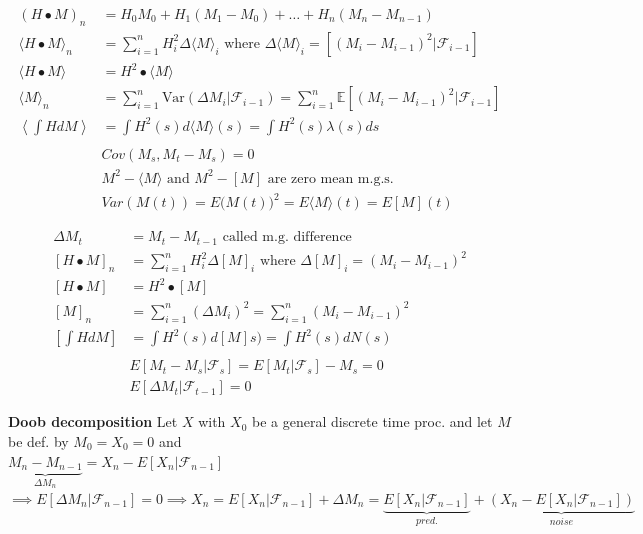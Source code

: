 \documentclass{article}
\begin{document}
\begin{minipage}{0.5\textwidth}
	\begin{align*}
		(H\bullet M)_n &= H_0M_0 + H_1(M_1-M_0) + \hdots + H_n(M_n-M_{n-1}) \\
		\langle H\bullet M \rangle_n &= \sum_{i=1}^n H_i^2\Delta\langle M\rangle_i \text{ where }\Delta \langle M\rangle_i = [(M_i - M_{i-1})^2|\mathcal{F}_{i-1}]\\
		\langle H\bullet M\rangle &= H^2\bullet \langle M\rangle \\
		\langle M \rangle_n &= \sum_{i=1}^n \text{Var}(\Delta M_i| \mathcal{F}_{i-1}) = \sum_{i=1}^n \mathbb{E}[(M_i - M_{i-1})^2|\mathcal{F}_{i-1}] \\
		\left\langle \int HdM\right\rangle &= \int H^2(s)d\langle M\rangle(s) = \int H^2(s) \lambda(s)ds \\
		\\
		&Cov(M_s, M_t-M_s) = 0 \\
		&M^2 - \langle M \rangle \text{ and } M^2 - [M] \text{ are zero mean m.g.s. }\\
		&Var (M(t)) = E\Big( M(t) \Big)^2 = E \langle M \rangle (t) = E[M](t)
	\end{align*}
\end{minipage}
\begin{minipage}{0.5\textwidth}
	\begin{align*}
		\Delta M_t &= M_t - M_{t-1} \text{ called m.g. difference}\\
		[H\bullet M]_n &= \sum_{i=1}^n H_i^2\Delta[M]_i \text{ where }\Delta [M]_i = (M_i - M_{i-1})^2\\
		[H\bullet M] &= H^2\bullet[M] \\
		[M]_n &= \sum_{i=1}^n (\Delta M_i)^2 = \sum_{i=1}^n (M_i -M_{i-1})^2 \\
		\left[ \int HdM\right] &= \int H^2(s)d[ M]s) = \int H^2(s) dN(s) \\
		\\
		&E[M_t-M_s | \mathcal{F}_s] = E[M_t|\mathcal{F}_s] - M_s = 0 \\
		&E[\Delta M_t | \mathcal{F}_{t-1}] = 0
	\end{align*}
\end{minipage}

\medskip

\textbf{Doob decomposition}
Let $X$ with $X_0$ be a general discrete time proc. and let $M$ be def. by $M_0 = X_0=0$ and \\  $\underbrace{M_n-M_{n-1}}_{\Delta M_n} = X_n-E[X_n|\mathcal{F}_{n-1}]$
$\implies E[\Delta M_n | \mathcal{F}_{n-1}] = 0 \implies X_n = E[X_n | \mathcal{F}_{n-1}] + \Delta M_n = \underbrace{E[X_n | \mathcal{F}_{n-1}]}_{pred.} + \underbrace{(X_n-E[X_n| \mathcal{F}_{n-1}])}_{noise}$
\end{document}
